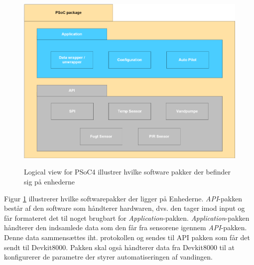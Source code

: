 \newenvironment{figure1}[1][]{\begin{figure}[#1]\vspace{3.0cm}}{\vspace{1.0cm}\end{figure}}
\begin{figure1}[htbp] \centering
{\includegraphics[scale=0.7]{filer/systemarkitektur/logical_view_psoc}}
\caption{Logical view for PSoC4 illustrer hvilke software pakker der befinder sig på enhederne}
\label{fig:Logical View PSoC}
\end{figure1}

Figur \ref{fig:Logical View PSoC} illustrerer hvilke softwarepakker der ligger på Enhederne. \textit{API}-pakken består af den software som håndterer hardwaren, dvs. den tager imod input og får formateret det til noget brugbart for \textit{Application}-pakken. \textit{Application}-pakken håndterer den indsamlede data som den får fra sensorene igennem \textit{API}-pakken. Denne data sammensættes iht. protokollen og sendes til API pakken som får det sendt til Devkit8000. Pakken skal også håndterer data fra Devkit8000 til at konfigurerer de parametre der styrer automatiseringen af vandingen.

